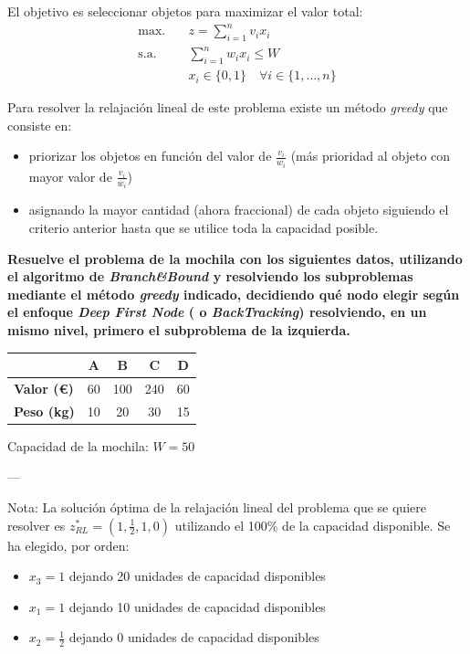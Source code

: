 
El objetivo es seleccionar objetos para maximizar el valor total: 
\begin{align*}
\text{max.} \quad & z = \sum_{i=1}^{n} v_i x_i \\
\text{s.a.} \quad & \sum_{i=1}^{n} w_i x_i \leq W \\
                 & x_i \in \{0,1\} \quad \forall i \in \{1, \dots, n\}
\end{align*}


Para resolver la relajación lineal de este problema existe un método \textit{greedy}  que consiste en:
\begin{itemize}
    \item priorizar los objetos en función del valor de $\frac{v_i}{w_i}$ (más prioridad al objeto con mayor valor de $\frac{v_i}{w_i}$)
    \item asignando la mayor cantidad (ahora fraccional) de cada objeto siguiendo el criterio anterior hasta que se utilice toda la capacidad posible.
\end{itemize}

\vspace{1cm}

\textbf{Resuelve el problema de la mochila con los siguientes datos, utilizando el algoritmo de \textit{Branch\&Bound} y resolviendo los subproblemas mediante el método \textit{greedy} indicado, decidiendo qué nodo elegir según el enfoque \textit{Deep First Node} ( o \textit{BackTracking}) resolviendo, en un mismo nivel, primero el subproblema de la izquierda.
\vspace{0.5cm}}

\begin{tabular}{|l|c|c|c|c|}
\hline
\textbf{} & \textbf{A} & \textbf{B} & \textbf{C} & \textbf{D} \\
\hline
\textbf{Valor (€)} & 60 & 100 & 240 & 60 \\
\hline
\textbf{Peso (kg)} & 10 & 20 & 30 & 15 \\
\hline
\end{tabular}

Capacidad de la mochila: $W=50$

---

Nota: La solución óptima de la relajación lineal del problema que se quiere resolver es $z^*_{RL}=(1,\frac{1}{2},1,0)$ utilizando el 100\% de la capacidad disponible. Se ha elegido, por orden:
\begin{itemize}
    \item $x_3=1$ dejando 20 unidades de capacidad disponibles
    \item $x_1=1$ dejando 10 unidades de capacidad disponibles
    \item $x_2=\frac{1}{2}$ dejando 0 unidades de capacidad disponibles

\end{itemize}

